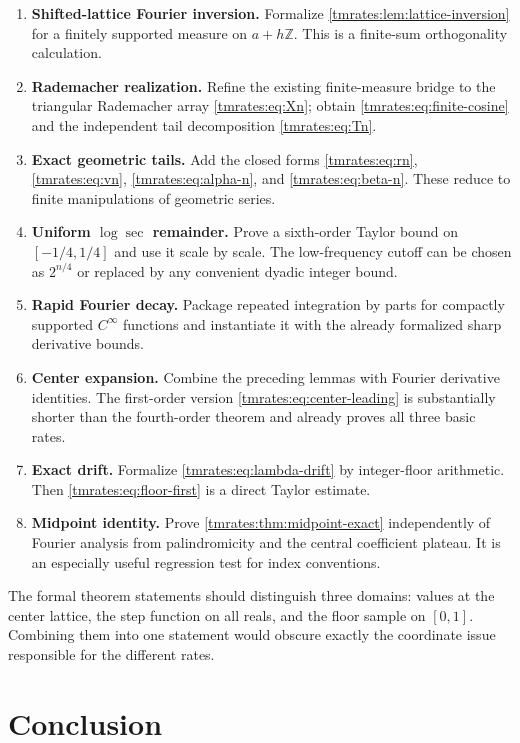 \documentclass[11pt,oneside]{article}
\theoremstyle{definition}
\theoremstyle{remark}
\newcommand{\Z}{\mathbb Z}
\begin{document}
\begin{enumerate}
\item \textbf{Shifted-lattice Fourier inversion.}  Formalize \cref{tmrates:lem:lattice-inversion} for
a finitely supported measure on $a+h\Z$.  This is a finite-sum orthogonality calculation.
\item \textbf{Rademacher realization.}  Refine the existing finite-measure bridge to the
triangular Rademacher array \eqref{tmrates:eq:Xn}; obtain \eqref{tmrates:eq:finite-cosine} and the independent
tail decomposition \eqref{tmrates:eq:Tn}.
\item \textbf{Exact geometric tails.}  Add the closed forms \eqref{tmrates:eq:rn}, \eqref{tmrates:eq:vn},
\eqref{tmrates:eq:alpha-n}, and \eqref{tmrates:eq:beta-n}.  These reduce to finite manipulations of geometric
series.
\item \textbf{Uniform $\log\sec$ remainder.}  Prove a sixth-order Taylor bound on
$[-1/4,1/4]$ and use it scale by scale.  The low-frequency cutoff can be chosen as
$2^{n/4}$ or replaced by any convenient dyadic integer bound.
\item \textbf{Rapid Fourier decay.}  Package repeated integration by parts for compactly
supported $C^\infty$ functions and instantiate it with the already formalized sharp derivative
bounds.
\item \textbf{Center expansion.}  Combine the preceding lemmas with Fourier derivative
identities.  The first-order version \eqref{tmrates:eq:center-leading} is substantially shorter than
the fourth-order theorem and already proves all three basic rates.
\item \textbf{Exact drift.}  Formalize \eqref{tmrates:eq:lambda-drift} by integer-floor arithmetic.
Then \eqref{tmrates:eq:floor-first} is a direct Taylor estimate.
\item \textbf{Midpoint identity.}  Prove \cref{tmrates:thm:midpoint-exact} independently of Fourier
analysis from palindromicity and the central coefficient plateau.  It is an especially useful
regression test for index conventions.
\end{enumerate}

The formal theorem statements should distinguish three domains: values at the center lattice,
the step function on all reals, and the floor sample on $[0,1]$.  Combining them into one
statement would obscure exactly the coordinate issue responsible for the different rates.

\section{Conclusion}
\label{tmrates:sec:conclusion}
\end{document}
